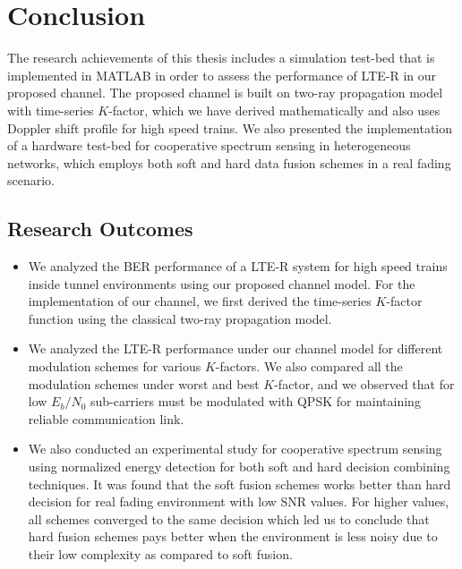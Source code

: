 \chapter{Conclusion}
\label{conclusion}
The research achievements of this thesis includes a simulation test-bed that is implemented in MATLAB in order to assess the performance of LTE-R in our proposed channel. The proposed channel is built on two-ray propagation model with time-series $K$-factor, which we have derived mathematically and also uses Doppler shift profile for high speed trains. We also presented the implementation of a hardware test-bed for cooperative spectrum sensing in heterogeneous networks, which employs both soft and hard data fusion schemes in a real fading scenario. 

\section{Research Outcomes}
\begin{itemize}
\item We analyzed the BER performance of a LTE-R system for high speed trains inside tunnel environments using our proposed channel model. For the implementation of our channel, we first derived the time-series $K$-factor function using the classical two-ray propagation model.

\item We analyzed the LTE-R performance under our channel model for different modulation schemes for various $K$-factors. We also compared all the modulation schemes under worst and best $K$-factor, and we observed that for low $E_b/N_0$ sub-carriers must be modulated with QPSK for maintaining reliable communication link.

\item We also conducted an experimental study for cooperative spectrum sensing using normalized energy detection for both soft and hard decision combining techniques. It was found that the soft fusion schemes works better than hard decision for real fading environment with low SNR values. For higher values, all schemes converged to the same decision which led us to conclude that hard fusion schemes pays better when the environment is less noisy due to their low complexity as compared to soft fusion.
\end{itemize}

